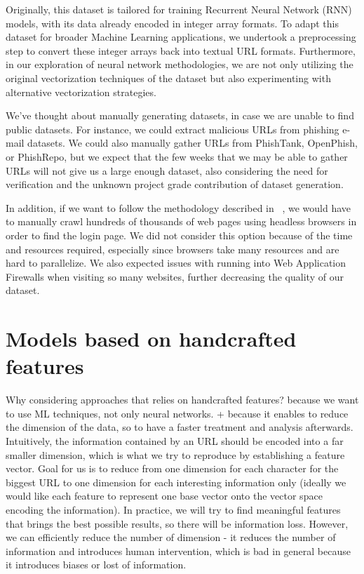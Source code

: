 \documentclass{article}
\begin{document}
    Originally, this dataset is tailored for training Recurrent Neural Network (RNN) models, with its data already encoded in integer array formats. To adapt this dataset for broader Machine Learning applications, we undertook a preprocessing step to convert these integer arrays back into textual URL formats. Furthermore, in our exploration of neural network methodologies, we are not only utilizing the original vectorization techniques of the dataset but also experimenting with alternative vectorization strategies.

    We've thought about manually generating datasets, in case we are unable to find public datasets.
    For instance, we could extract malicious URLs from phishing e-mail datasets.
    We could also manually gather URLs from PhishTank, OpenPhish, or PhishRepo, but we expect that the few weeks that we may be able to gather URLs will not give us a large enough dataset, also considering the need for verification and the unknown project grade contribution of dataset generation.

    In addition, if we want to follow the methodology described in ~\cite{PhishingLoginURLDetection}, we would have to manually crawl hundreds of thousands of web pages using headless browsers in order to find the login page.
    We did not consider this option because of the time and resources required, especially since browsers take many resources and are hard to parallelize.
    We also expected issues with running into Web Application Firewalls when visiting so many websites, further decreasing the quality of our dataset.

    \section{Models based on handcrafted features}\label{sec:models-based-on-handcrafted-features}

    Why considering approaches that relies on handcrafted features?
    because we want to use ML techniques, not only neural networks.
    + because it enables to reduce the dimension of the data, so to have a faster treatment and analysis afterwards.
    Intuitively, the information contained by an URL should be encoded into a far smaller dimension, which is what we try to reproduce by establishing a feature vector.
    Goal for us is to reduce from one dimension for each character for the biggest URL to one dimension for each interesting information only (ideally we would like each feature to represent one base vector onto the vector space encoding the information).
    In practice, we will try to find meaningful features that brings the best possible results, so there will be information loss.
    However, we can efficiently reduce the number of dimension
    - it reduces the number of information and introduces human intervention, which is bad in general because it introduces biases or lost of information.
\end{document}

